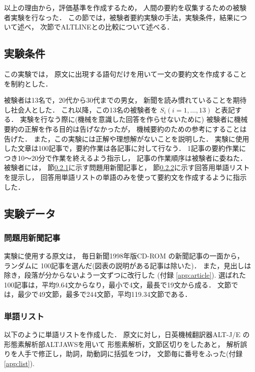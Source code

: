 以上の理由から，評価基準を作成するため，
人間の要約を収集するための被験者実験を行なった．
この節では，被験者要約実験の手法，実験条件，結果について述べ，
次節でALTLINEとの比較について述べる．

\subsection{実験条件}

この実験では，
原文に出現する語句だけを用いて一文の要約文を作成することを制約とした．

被験者は13名で，20代から30代までの男女，
新聞を読み慣れていることを期待し社会人とした．
これ以降，この13名の被験者を $S_{i} (i=1,\ldots,13)$ と表記する．
実験を行なう際に(機械を意識した回答を作らせないために)
被験者に機械要約の正解を作る目的は告げなかったが，
機械要約のための参考にすることは告げた．
また，この実験には正解や理想解がないことを説明した．
実験に使用した文章は100記事で，要約作業は各記事に対して行なう．
1記事の要約作業につき10〜20分で作業を終えるよう指示し，
記事の作業順序は被験者に委ねた．
被験者には，
節\ref{sec:Newspaper articles}に示す問題用新聞記事と，
節\ref{sec:wordlist}に示す回答用単語リストを提示し，
回答用単語リストの単語のみを使って要約文を作成するように指示した．

\subsection{実験データ}

\subsubsection{問題用新聞記事}
\label{sec:Newspaper articles}

実験に使用する原文は，
毎日新聞1998年版CD-ROM の新聞記事の一面から，
ランダムに 100記事を選んだ(図表の説明がある記事は除いた)．
また，見出しは除き，段落が分からないよう一文ずつに改行した
(付録 \ref{app:article}).
選ばれた100記事は，平均9.64文からなり，最小で4文，最長で19文から成る．
文節では，最少で49文節，最多で244文節，平均119.34文節である．


\subsubsection{単語リスト}
\label{sec:wordlist}

以下のように単語リストを作成した．
原文に対し，日英機械翻訳器ALT-J/E の形態素解析部ALTJAWSを用いて
形態素解析，文節区切りをしたあと，
解析誤りを人手で修正し，助詞，助動詞に括弧をつけ，
文節毎に番号をふった(付録 \ref{app:list}).


